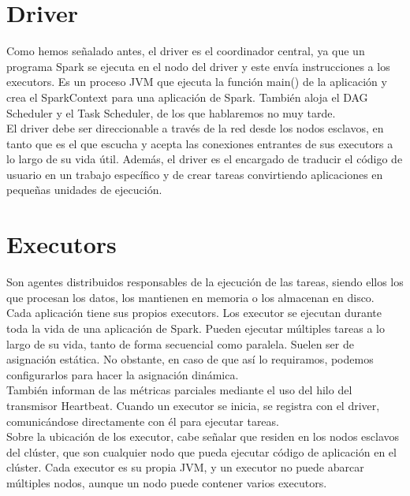 \section{Driver}

Como hemos señalado antes, el driver es el coordinador central, ya que un programa Spark se ejecuta en el nodo del driver y este envía instrucciones a los executors. Es un proceso JVM que ejecuta la función main() de la aplicación y crea el SparkContext para una aplicación de Spark. También aloja el DAG Scheduler y el Task Scheduler, de los que hablaremos no muy tarde.\\

El driver debe ser direccionable a través de la red desde los nodos esclavos, en tanto que es el que escucha y acepta las conexiones entrantes de sus executors a lo largo de su vida útil. Además, el driver es el encargado de traducir el código de usuario en un trabajo específico y de crear tareas convirtiendo aplicaciones en pequeñas unidades de ejecución.\\

\section{Executors}

Son agentes distribuidos responsables de la ejecución de las tareas, siendo ellos los que procesan los datos, los mantienen en memoria o los almacenan en disco.\\

Cada aplicación tiene sus propios executors. Los executor se ejecutan durante toda la vida de una aplicación de Spark. Pueden ejecutar múltiples tareas a lo largo de su vida, tanto de forma secuencial como paralela. Suelen ser de asignación estática. No obstante, en caso de que así lo requiramos, podemos configurarlos para hacer la asignación dinámica.\\

También informan de las métricas parciales mediante el uso del hilo del transmisor Heartbeat. Cuando un executor se inicia, se registra con el driver, comunicándose directamente con él para ejecutar tareas.\\

Sobre la ubicación de los executor, cabe señalar que residen en los nodos esclavos del clúster, que son cualquier nodo que pueda ejecutar código de aplicación en el clúster. Cada executor es su propia JVM, y un executor no puede abarcar múltiples nodos, aunque un nodo puede contener varios executors.\\

